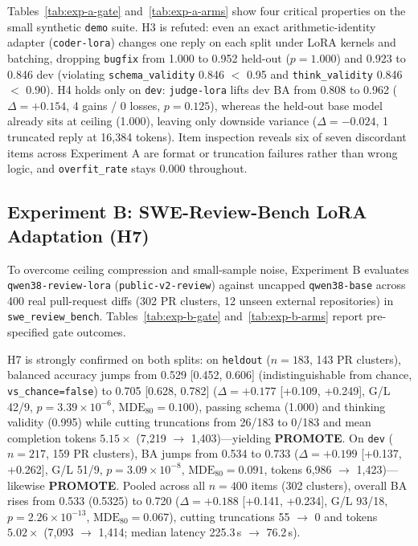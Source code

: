 \documentclass[conference]{IEEEtran}
\begin{document}
Tables~\ref{tab:exp-a-gate} and~\ref{tab:exp-a-arms} show four critical properties on the small synthetic \texttt{demo} suite. H3 is refuted: even an exact arithmetic-identity adapter (\texttt{coder-{}lora}) changes one reply on each split under LoRA kernels and batching, dropping \texttt{bugfix} from 1.000 to 0.952 held-out ($p=1.000$) and 0.923 to 0.846 dev (violating \texttt{schema\_\allowbreak{}validity} 0.846 $<$ 0.95 and \texttt{think\_\allowbreak{}validity} 0.846 $<$ 0.90). H4 holds only on \texttt{dev}: \texttt{judge-{}lora} lifts dev BA from 0.808 to 0.962 ($\Delta=+0.154$, 4 gains / 0 losses, $p=0.125$), whereas the held-out base model already sits at ceiling (1.000), leaving only downside variance ($\Delta=-0.024$, 1 truncated reply at 16,384 tokens). Item inspection reveals six of seven discordant items across Experiment A are format or truncation failures rather than wrong logic, and \texttt{overfit\_rate} stays 0.000 throughout.





\subsection{Experiment B: SWE-Review-Bench LoRA Adaptation (H7)}
\label{sec:results-expb}

To overcome ceiling compression and small-sample noise, Experiment B evaluates \texttt{qwen38-{}review-{}lora} (\texttt{public-{}v2-{}review}) against uncapped \texttt{qwen38-{}base} across 400 real pull-request diffs (302 PR clusters, 12 unseen external repositories) in \texttt{swe\_\allowbreak{}review\_\allowbreak{}bench}. Tables~\ref{tab:exp-b-gate} and~\ref{tab:exp-b-arms} report pre-specified gate outcomes.





H7 is strongly confirmed on both splits: on \texttt{heldout} ($n=183$, 143 PR clusters), balanced accuracy jumps from 0.529 [0.452, 0.606] (indistinguishable from chance, \texttt{vs\_chance=false}) to 0.705 [0.628, 0.782] ($\Delta=+0.177$ [+0.109, +0.249], G/L 42/9, $p=3.39\times 10^{-6}$, $\mathrm{MDE}_{80}=0.100$), passing schema (1.000) and thinking validity (0.995) while cutting truncations from 26/183 to 0/183 and mean completion tokens $5.15\times$ (7,219 $\to$ 1,403)---yielding \textbf{PROMOTE}. On \texttt{dev} ($n=217$, 159 PR clusters), BA jumps from 0.534 to 0.733 ($\Delta=+0.199$ [+0.137, +0.262], G/L 51/9, $p=3.09\times 10^{-8}$, $\mathrm{MDE}_{80}=0.091$, tokens 6,986 $\to$ 1,423)---likewise \textbf{PROMOTE}. Pooled across all $n=400$ items (302 clusters), overall BA rises from 0.533 (0.5325) to 0.720 ($\Delta=+0.188$ [+0.141, +0.234], G/L 93/18, $p=2.26\times 10^{-13}$, $\mathrm{MDE}_{80}=0.067$), cutting truncations 55 $\to$ 0 and tokens $5.02\times$ (7,093 $\to$ 1,414; median latency 225.3\,s $\to$ 76.2\,s).
\end{document}

